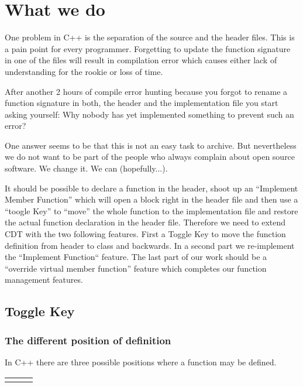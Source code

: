 \documentclass[a4paper,10pt]{scrreprt}
\begin{document}
\section{What we do}
One problem in C++ is the separation of the source and the header files. This is a pain point for every programmer. Forgetting to update the function signature in one of the files will result in compilation error which causes either lack of understanding for the rookie or loss of time.

After another 2 hours of compile error hunting because you forgot to rename a function signature in both, the header and the implementation file you start asking yourself: Why nobody has yet implemented something to prevent such an error?

One answer seems to be that this is not an easy task to archive. But nevertheless we do not want to be part of the people who always complain about open source software. We change it. We can (hopefully...).

It should be possible to declare a function in the header, shoot up an ``Implement Member Function'' which will open a block right in the header file and then use a ``toogle Key'' to ``move'' the whole function to the implementation file and restore the actual function declaration in the header file. Therefore we need to extend CDT with the two following features. First a Toggle Key to move the function definition from header to class and backwards. In a second part we re-implement the ``Implement Function`` feature. The last part of our work should be a ``override virtual member function'' feature which completes our function management features.

\subsection{Toggle Key}

\subsubsection{The different position of definition}

In C++ there are three possible positions where a function may be defined.




\begin{tabular}{p{5cm}p{.5cm}p{6cm}}

& &

\end{tabular}
\end{document}

